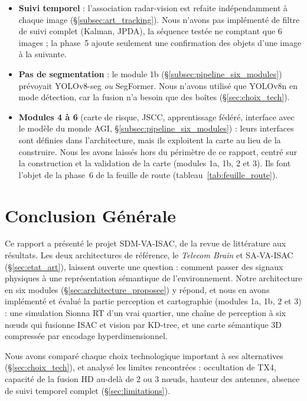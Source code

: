 \documentclass[12pt,a4paper,titlepage]{article}
\begin{document}
\begin{itemize}[leftmargin=1.5em]
    \item \textbf{Suivi temporel} : l'association radar-vision est refaite indépendamment à chaque image (\S\ref{subsec:art_tracking}). Nous n'avons pas implémenté de filtre de suivi complet (Kalman, JPDA), la séquence testée ne comptant que 6 images ; la phase~5 ajoute seulement une confirmation des objets d'une image à la suivante.
    \item \textbf{Pas de segmentation} : le module 1b (\S\ref{subsec:pipeline_six_modules}) prévoyait YOLOv8-seg \textit{ou} SegFormer. Nous n'avons utilisé que YOLOv8n en mode détection, car la fusion n'a besoin que des boîtes (\S\ref{sec:choix_tech}).
    \item \textbf{Modules 4 à 6} (carte de risque, JSCC, apprentissage fédéré, interface avec le modèle du monde AGI, \S\ref{subsec:pipeline_six_modules}) : leurs interfaces sont définies dans l'architecture, mais ils exploitent la carte au lieu de la construire. Nous les avons laissés hors du périmètre de ce rapport, centré sur la construction et la validation de la carte (modules 1a, 1b, 2 et 3). Ils font l'objet de la phase~6 de la feuille de route (tableau~\ref{tab:feuille_route}).
\end{itemize}

\section{Conclusion Générale}
\label{sec:conclusion}

Ce rapport a présenté le projet SDM-VA-ISAC, de la revue de littérature aux résultats. Les deux architectures de référence, le \textit{Telecom Brain} et SA-VA-ISAC (\S\ref{sec:etat_art}), laissent ouverte une question : comment passer des signaux physiques à une représentation sémantique de l'environnement. Notre architecture en six modules (\S\ref{sec:architecture_proposee}) y répond, et nous en avons implémenté et évalué la partie perception et cartographie (modules 1a, 1b, 2 et 3) : une simulation Sionna RT d'un vrai quartier, une chaîne de perception à six n\oe uds qui fusionne ISAC et vision par KD-tree, et une carte sémantique 3D compressée par encodage hyperdimensionnel.

Nous avons comparé chaque choix technologique important à ses alternatives (\S\ref{sec:choix_tech}), et analysé les limites rencontrées : occultation de TX4, capacité de la fusion HD au-delà de 2 ou 3 n\oe uds, hauteur des antennes, absence de suivi temporel complet (\S\ref{sec:limitations}).
\end{document}
